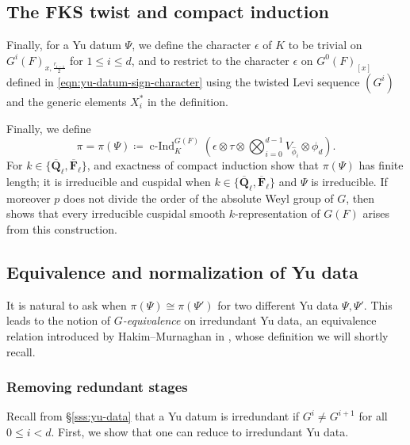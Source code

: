 \documentclass[reqno]{amsart}
\numberwithin{equation}{subsection}
\newcommand{\F}{\mathbf{F}}
\newcommand{\Q}{\mathbf{Q}}
\newcommand{\ol}[1]{\overline{#1}}
\DeclareMathOperator{\cInd}{c-Ind}
\theoremstyle{remark}
\numberwithin{equation}{subsection}
\numberwithin{figure}{subsection}
\begin{document}
\subsection{The FKS twist and compact induction}\label{sss:yu-data-fks}
Finally, for a Yu datum $\Psi$, we define the character $\epsilon$ of $K$ to be trivial on $G^i(F)_{x,\frac{r_{i-1}}{2}}$ for $1 \leq i \leq d$, and to restrict to the character $\epsilon$ on $G^0(F)_{[x]}$ defined in \eqref{eqn:yu-datum-sign-character} using the twisted Levi sequence $(G^i)$ and the generic elements $X_i^*$ in the definition.

Finally, we define
\begin{equation}\label{eq:yu-compact-induction}
\pi = \pi(\Psi) \coloneqq \cInd_K^{G(F)}(\epsilon \otimes \tau \otimes \bigotimes_{i=0}^{d-1} V_{\widehat{\phi}_i} \otimes \phi_d).
\end{equation}
For $k\in\{\ol\Q_\ell,\ol\F_\ell\}$, \cite[Theorem~3.1]{Fin22} and exactness of compact induction show that $\pi(\Psi)$ has finite length; it is irreducible and cuspidal when $k \in \{\ol\Q_\ell, \ol\F_\ell\}$ and $\Psi$ is irreducible. If moreover $p$ does not divide the order of the absolute Weyl group of $G$, then \cite[Theorem~4.1]{Fin22} shows that every irreducible cuspidal smooth $k$-representation of $G(F)$ arises from this construction.



\subsection{Equivalence and normalization of Yu data}\label{sss:hm}

It is natural to ask when $\pi(\Psi) \cong \pi(\Psi')$ for two different Yu data $\Psi, \Psi'$. This leads to the notion of \textit{$G$-equivalence} on irredundant Yu data, an equivalence relation introduced by Hakim--Murnaghan in \cite[Definition 6.1]{HM08}, whose definition we will shortly recall.

\subsubsection{Removing redundant stages} Recall from \S\ref{sss:yu-data} that a Yu datum is irredundant if $G^i\neq G^{i+1}$ for all $0\leq i<d$. First, we show that one can reduce to irredundant Yu data.
\end{document}
